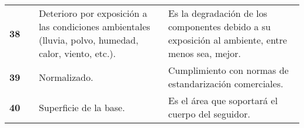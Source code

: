 \begin{table}[H]
\begin{tabular}{|c|c|p{10em}|p{21em}|}
		\cline{1-1}\cline{3-4}    \textbf{38} &       & Deterioro por exposición a las condiciones ambientales (lluvia, polvo, humedad, calor, viento, etc.). & Es la degradación de los componentes debido a su exposición al ambiente, entre menos sea, mejor. \\
		\cline{1-1}\cline{3-4}    \textbf{39} &       & Normalizado. & Cumplimiento con normas de estandarización comerciales. \\
		\cline{1-1}\cline{3-4}    \textbf{40} &       & Superficie de la base. & Es el área que soportará el cuerpo del seguidor. \\
		\hline
	\end{tabular}%
	\label{tab:addlabel}%
\end{table}%

\newpage
